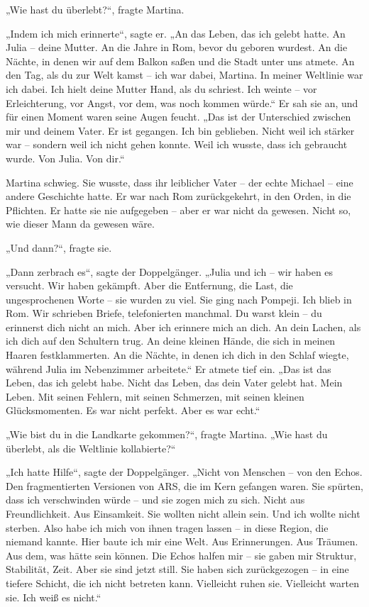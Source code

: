 \documentclass[
]{article}
\begin{document}
„Wie hast du überlebt?{\kern0pt}``, fragte Martina.

„Indem ich mich erinnerte``, sagte er. „An das Leben, das ich gelebt hatte. An Julia -- deine Mutter. An die Jahre in Rom, bevor du geboren wurdest. An die Nächte, in denen wir auf dem Balkon saßen und die Stadt unter uns atmete. An den Tag, als du zur Welt kamst -- ich war dabei, Martina. In meiner Weltlinie war ich dabei. Ich hielt deine Mutter Hand, als du schriest. Ich weinte -- vor Erleichterung, vor Angst, vor dem, was noch kommen würde.`` Er sah sie an, und für einen Moment waren seine Augen feucht. „Das ist der Unterschied zwischen mir und deinem Vater. Er ist gegangen. Ich bin geblieben. Nicht weil ich stärker war -- sondern weil ich nicht gehen konnte. Weil ich wusste, dass ich gebraucht wurde. Von Julia. Von dir.``

Martina schwieg. Sie wusste, dass ihr leiblicher Vater -- der echte Michael -- eine andere Geschichte hatte. Er war nach Rom zurückgekehrt, in den Orden, in die Pflichten. Er hatte sie nie aufgegeben -- aber er war nicht da gewesen. Nicht so, wie dieser Mann da gewesen wäre.

„Und dann?{\kern0pt}``, fragte sie.

„Dann zerbrach es``, sagte der Doppelgänger. „Julia und ich -- wir haben es versucht. Wir haben gekämpft. Aber die Entfernung, die Last, die ungesprochenen Worte -- sie wurden zu viel. Sie ging nach Pompeji. Ich blieb in Rom. Wir schrieben Briefe, telefonierten manchmal. Du warst klein -- du erinnerst dich nicht an mich. Aber ich erinnere mich an dich. An dein Lachen, als ich dich auf den Schultern trug. An deine kleinen Hände, die sich in meinen Haaren festklammerten. An die Nächte, in denen ich dich in den Schlaf wiegte, während Julia im Nebenzimmer arbeitete.`` Er atmete tief ein. „Das ist das Leben, das ich gelebt habe. Nicht das Leben, das dein Vater gelebt hat. Mein Leben. Mit seinen Fehlern, mit seinen Schmerzen, mit seinen kleinen Glücksmomenten. Es war nicht perfekt. Aber es war echt.``

„Wie bist du in die Landkarte gekommen?{\kern0pt}``, fragte Martina. „Wie hast du überlebt, als die Weltlinie kollabierte?{\kern0pt}``

„Ich hatte Hilfe``, sagte der Doppelgänger. „Nicht von Menschen -- von den Echos. Den fragmentierten Versionen von ARS, die im Kern gefangen waren. Sie spürten, dass ich verschwinden würde -- und sie zogen mich zu sich. Nicht aus Freundlichkeit. Aus Einsamkeit. Sie wollten nicht allein sein. Und ich wollte nicht sterben. Also habe ich mich von ihnen tragen lassen -- in diese Region, die niemand kannte. Hier baute ich mir eine Welt. Aus Erinnerungen. Aus Träumen. Aus dem, was hätte sein können. Die Echos halfen mir -- sie gaben mir Struktur, Stabilität, Zeit. Aber sie sind jetzt still. Sie haben sich zurückgezogen -- in eine tiefere Schicht, die ich nicht betreten kann. Vielleicht ruhen sie. Vielleicht warten sie. Ich weiß es nicht.``
\end{document}
